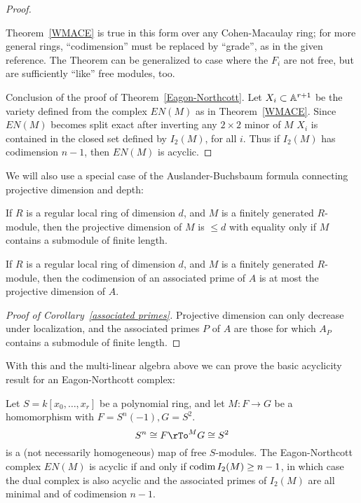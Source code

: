 \begin{proof}
\begin{fact}
Theorem~\ref{WMACE} is true in this form over any Cohen-Macaulay ring; for more general
rings, ``codimension'' must be replaced by ``grade'', as in the given reference.
The Theorem can be generalized
to case where the $F_i$ are not free, but are sufficiently ``like'' free modules, too.
\end{fact}

Conclusion of the proof of Theorem~\ref{Eagon-Northcott}.
Let $X_{i}\subset \AA^{r+1}$ be the variety defined from the complex $EN(M)$ as in 
Theorem~\ref{WMACE}. Since $EN(M)$ becomes split exact after inverting any $2\times 2$ minor of $M$
$X_{i}$ is
contained in the closed set defined by $I_{2}(M)$, for all $i$. Thus if $I_{2}(M)$ has codimension $n-1$,
then $EN(M)$ is acyclic. 
\end {proof}

We will also use a special case of the Auslander-Buchsbaum formula connecting projective dimension and depth:

\begin{theorem}\label{Auslander-Buchsbaum}
If $R$ is a regular local ring of dimension $d$, and $M$ is a finitely generated $R$-module, then the projective dimension of $M$ is $\leq d$ with equality only if
$M$ contains a submodule of finite length. 
\end{theorem}

\begin{corollary}\label{associated primes}
If $R$ is a regular local ring of dimension $d$, and $M$ is a finitely generated $R$-module, then the codimension of an associated prime of $A$ is at most the projective dimension of $A$. 
\end{corollary}
\begin{proof}[Proof of  Corollary~\ref{associated primes}]
 Projective dimension can only decrease under localization, and
 the associated primes $P$ of $A$ are those for which $A_{P}$ contains a submodule
 of finite length.
\end{proof}

With this and the multi-linear algebra above we can  prove the basic acyclicity result for an Eagon-Northcott complex:

\begin{proposition}\label{acyclicity}
Let $S = k[x_0,\dots, x_r]$ be a polynomial ring,  and let $M: F\to G$ be a homomorphism with
 $F = S^n(-1), G= S^2$.
 $$
 S^n \cong F \rTo^M G \cong S^2
 $$
 is a (not necessarily homogeneous) map of free $S$-modules.
 The Eagon-Northcott complex $EN(M)$ is acyclic if and only if $\codim I_2(M) \geq n-1$, in which case the dual complex is also acyclic and
 the associated primes of $I_2(M)$ are all minimal and of codimension $n-1$.
 \end{proposition}

